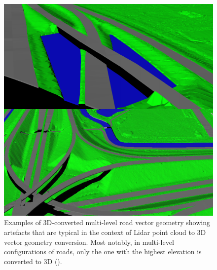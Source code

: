 \begin{figure}
    \includegraphics[width=\linewidth]{p2/figs/oudeElberink_vosselman_2006_03.png} 
    \caption{Examples of 3D-converted multi-level road vector geometry showing artefacts that are typical in the context of Lidar point cloud to 3D vector geometry conversion. Most notably, in multi-level configurations of roads, only the one with the highest elevation is converted to 3D (\cite{oudeElberink_vosselman_2006}).}
    \label{fig:conversionartefacts}
\end{figure}
